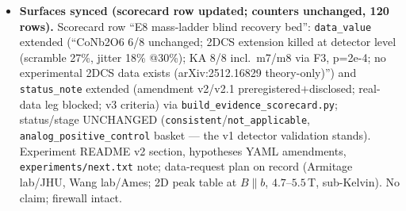 \documentclass[11pt]{article}
\begin{document}
\begin{itemize}[leftmargin=1.5em]
coincidence-based coverage and a sparser catalog, preregistered BEFORE real data exists.
\item \textbf{Surfaces synced (scorecard row updated; counters unchanged, 120 rows).} Scorecard row
``E8 mass-ladder blind recovery bed'': \texttt{data\_value} extended (``CoNb2O6 6/8 unchanged; 2DCS
extension killed at detector level (scramble 27\%, jitter 18\% @30\%); KA 8/8 incl.\ m7/m8 via F3,
p=2e-4; no experimental 2DCS data exists (arXiv:2512.16829 theory-only)'') and
\texttt{status\_note} extended (amendment v2/v2.1 preregistered$+$disclosed; real-data leg blocked;
v3 criteria) via \texttt{build\_evidence\_scorecard.py}; status/stage UNCHANGED
(\texttt{consistent}/\texttt{not\_applicable}, \texttt{analog\_positive\_control} basket --- the v1
detector validation stands). Experiment README v2 section, hypotheses YAML amendments,
\texttt{experiments/next.txt} note; data-request plan on record (Armitage lab/JHU, Wang lab/Ames;
2D peak table at $B\parallel b$, $4.7$--$5.5$\,T, sub-Kelvin). No claim; firewall intact.
\end{itemize}
\end{document}
